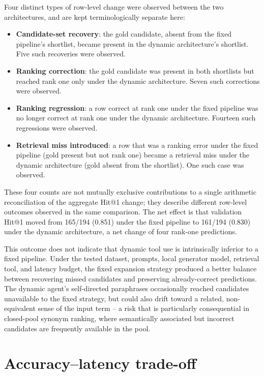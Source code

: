 Four distinct types of row-level change were observed between the two architectures, and are kept terminologically separate here:

\begin{itemize}
  \item \textbf{Candidate-set recovery}: the gold candidate, absent from the fixed pipeline's shortlist, became present in the dynamic architecture's shortlist. Five such recoveries were observed.
  \item \textbf{Ranking correction}: the gold candidate was present in both shortlists but reached rank one only under the dynamic architecture. Seven such corrections were observed.
  \item \textbf{Ranking regression}: a row correct at rank one under the fixed pipeline was no longer correct at rank one under the dynamic architecture. Fourteen such regressions were observed.
  \item \textbf{Retrieval miss introduced}: a row that was a ranking error under the fixed pipeline (gold present but not rank one) became a retrieval miss under the dynamic architecture (gold absent from the shortlist). One such case was observed.
\end{itemize}

These four counts are not mutually exclusive contributions to a single arithmetic reconciliation of the aggregate Hit@1 change; they describe different row-level outcomes observed in the same comparison. The net effect is that validation Hit@1 moved from 165/194 (0.851) under the fixed pipeline to 161/194 (0.830) under the dynamic architecture, a net change of four rank-one predictions.

This outcome does not indicate that dynamic tool use is intrinsically inferior to a fixed pipeline. Under the tested dataset, prompts, local generator model, retrieval tool, and latency budget, the fixed expansion strategy produced a better balance between recovering missed candidates and preserving already-correct predictions. The dynamic agent's self-directed paraphrases occasionally reached candidates unavailable to the fixed strategy, but could also drift toward a related, non-equivalent sense of the input term -- a risk that is particularly consequential in closed-pool synonym ranking, where semantically associated but incorrect candidates are frequently available in the pool.

\section{Accuracy--latency trade-off}
\label{sec:latency}

